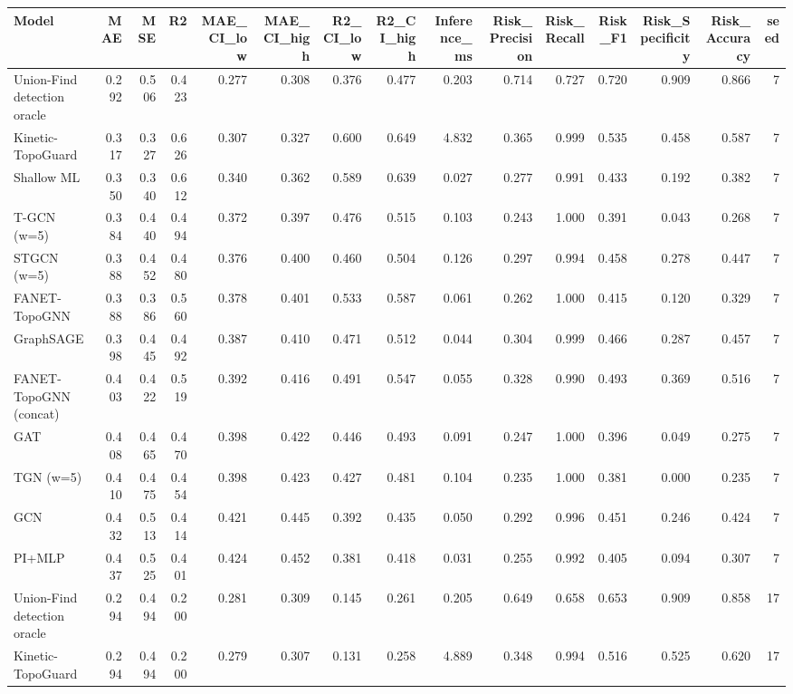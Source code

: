 \begin{tabular}{lrrrrrrrrrrrrrr}
\toprule
Model & MAE & MSE & R2 & MAE\_CI\_low & MAE\_CI\_high & R2\_CI\_low & R2\_CI\_high & Inference\_ms & Risk\_Precision & Risk\_Recall & Risk\_F1 & Risk\_Specificity & Risk\_Accuracy & seed \\
\midrule
Union-Find detection oracle & 0.292 & 0.506 & 0.423 & 0.277 & 0.308 & 0.376 & 0.477 & 0.203 & 0.714 & 0.727 & 0.720 & 0.909 & 0.866 & 7 \\
Kinetic-TopoGuard & 0.317 & 0.327 & 0.626 & 0.307 & 0.327 & 0.600 & 0.649 & 4.832 & 0.365 & 0.999 & 0.535 & 0.458 & 0.587 & 7 \\
Shallow ML & 0.350 & 0.340 & 0.612 & 0.340 & 0.362 & 0.589 & 0.639 & 0.027 & 0.277 & 0.991 & 0.433 & 0.192 & 0.382 & 7 \\
T-GCN (w=5) & 0.384 & 0.440 & 0.494 & 0.372 & 0.397 & 0.476 & 0.515 & 0.103 & 0.243 & 1.000 & 0.391 & 0.043 & 0.268 & 7 \\
STGCN (w=5) & 0.388 & 0.452 & 0.480 & 0.376 & 0.400 & 0.460 & 0.504 & 0.126 & 0.297 & 0.994 & 0.458 & 0.278 & 0.447 & 7 \\
FANET-TopoGNN & 0.388 & 0.386 & 0.560 & 0.378 & 0.401 & 0.533 & 0.587 & 0.061 & 0.262 & 1.000 & 0.415 & 0.120 & 0.329 & 7 \\
GraphSAGE & 0.398 & 0.445 & 0.492 & 0.387 & 0.410 & 0.471 & 0.512 & 0.044 & 0.304 & 0.999 & 0.466 & 0.287 & 0.457 & 7 \\
FANET-TopoGNN (concat) & 0.403 & 0.422 & 0.519 & 0.392 & 0.416 & 0.491 & 0.547 & 0.055 & 0.328 & 0.990 & 0.493 & 0.369 & 0.516 & 7 \\
GAT & 0.408 & 0.465 & 0.470 & 0.398 & 0.422 & 0.446 & 0.493 & 0.091 & 0.247 & 1.000 & 0.396 & 0.049 & 0.275 & 7 \\
TGN (w=5) & 0.410 & 0.475 & 0.454 & 0.398 & 0.423 & 0.427 & 0.481 & 0.104 & 0.235 & 1.000 & 0.381 & 0.000 & 0.235 & 7 \\
GCN & 0.432 & 0.513 & 0.414 & 0.421 & 0.445 & 0.392 & 0.435 & 0.050 & 0.292 & 0.996 & 0.451 & 0.246 & 0.424 & 7 \\
PI+MLP & 0.437 & 0.525 & 0.401 & 0.424 & 0.452 & 0.381 & 0.418 & 0.031 & 0.255 & 0.992 & 0.405 & 0.094 & 0.307 & 7 \\
Union-Find detection oracle & 0.294 & 0.494 & 0.200 & 0.281 & 0.309 & 0.145 & 0.261 & 0.205 & 0.649 & 0.658 & 0.653 & 0.909 & 0.858 & 17 \\
Kinetic-TopoGuard & 0.294 & 0.494 & 0.200 & 0.279 & 0.307 & 0.131 & 0.258 & 4.889 & 0.348 & 0.994 & 0.516 & 0.525 & 0.620 & 17 \\

\end{tabular}
